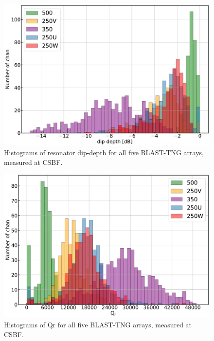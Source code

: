 \begin{figure}[!htbp]
\centering
\includegraphics[width=\textwidth]{figures/blast_data/hist/PAL_depth_hist}
\caption[~Histograms of resonator dip-depth for all five BLAST-TNG arrays, measured at CSBF.]{Histograms of resonator dip-depth for all five BLAST-TNG arrays, measured at CSBF.}
\label{fig:pal depth hist}
\end{figure}

\begin{figure}[!htbp]
\centering
\includegraphics[width=\textwidth]{figures/blast_data/hist/PAL_Qr_hist}
\caption[~Histograms of  for all five BLAST-TNG arrays, measured at CSBF.]{Histograms of \gls{Qr} for all five BLAST-TNG arrays, measured at CSBF.}
\label{fig:pal qr hist}
\end{figure}

